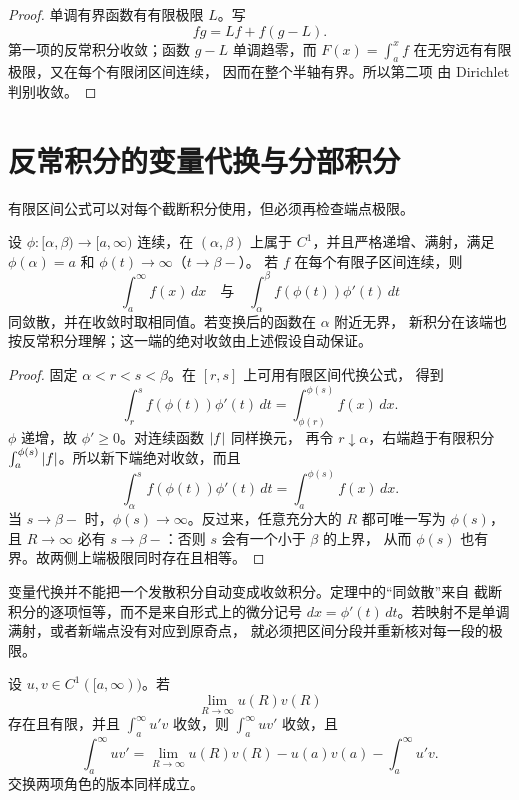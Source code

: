 \begin{proof}
单调有界函数有有限极限 \(L\)。写
\[
 fg=L f+f(g-L).
\]
第一项的反常积分收敛；函数 \(g-L\) 单调趋零，而
\(F(x)=\int_a^x f\) 在无穷远有有限极限，又在每个有限闭区间连续，
因而在整个半轴有界。所以第二项
由 Dirichlet 判别收敛。
\end{proof}

\section{反常积分的变量代换与分部积分}

有限区间公式可以对每个截断积分使用，但必须再检查端点极限。

\begin{theorem}[反常积分中的变量代换]
\label{thm:improper-substitution}
设 \(\phi:[\alpha,\beta)\to[a,\infty)\) 连续，在
\((\alpha,\beta)\) 上属于 \(C^1\)，并且严格递增、满射，满足
\(\phi(\alpha)=a\) 和 \(\phi(t)\to\infty\)（\(t\to\beta-\)）。
若 \(f\) 在每个有限子区间连续，则
\[
 \int_a^\infty f(x)\,dx
 \quad\text{与}\quad
 \int_\alpha^\beta f(\phi(t))\phi'(t)\,dt
\]
同敛散，并在收敛时取相同值。若变换后的函数在 \(\alpha\) 附近无界，
新积分在该端也按反常积分理解；这一端的绝对收敛由上述假设自动保证。
\end{theorem}

\begin{proof}
固定 \(\alpha<r<s<\beta\)。在 \([r,s]\) 上可用有限区间代换公式，
得到
\[
 \int_r^s f(\phi(t))\phi'(t)\,dt
 =\int_{\phi(r)}^{\phi(s)}f(x)\,dx.
\]
\(\phi\) 递增，故 \(\phi'\ge0\)。对连续函数 \(\left|f\right|\) 同样换元，
再令 \(r\downarrow\alpha\)，右端趋于有限积分
\(\int_a^{\phi(s)}\left|f\right|\)。所以新下端绝对收敛，而且
\[
 \int_\alpha^s f(\phi(t))\phi'(t)\,dt
 =\int_a^{\phi(s)}f(x)\,dx.
\]
当 \(s\to\beta-\) 时，\(\phi(s)\to\infty\)。反过来，任意充分大的
\(R\) 都可唯一写为 \(\phi(s)\)，且 \(R\to\infty\) 必有
\(s\to\beta-\)：否则 \(s\) 会有一个小于 \(\beta\) 的上界，
从而 \(\phi(s)\) 也有界。故两侧上端极限同时存在且相等。
\end{proof}

变量代换并不能把一个发散积分自动变成收敛积分。定理中的“同敛散”来自
截断积分的逐项恒等，而不是来自形式上的微分记号
\(dx=\phi'(t)\,dt\)。若映射不是单调满射，或者新端点没有对应到原奇点，
就必须把区间分段并重新核对每一段的极限。

\begin{theorem}[反常分部积分]
\label{thm:improper-integration-by-parts}
设 \(u,v\in C^1([a,\infty))\)。若
\[
 \lim_{R\to\infty}u(R)v(R)
\]
存在且有限，并且 \(\int_a^\infty u'v\) 收敛，则
\(\int_a^\infty uv'\) 收敛，且
\[
 \int_a^\infty uv'
 =\lim_{R\to\infty}u(R)v(R)-u(a)v(a)
  -\int_a^\infty u'v.
\]
交换两项角色的版本同样成立。
\end{theorem}

